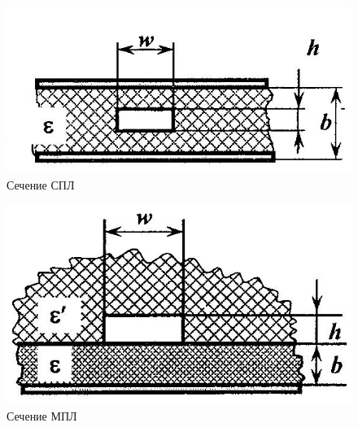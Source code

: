 \documentclass[fontsize=14pt,a4paper]{scrartcl}
\begin{document}
    \begin{figure}[h!]
      \centering
      \includegraphics[scale=0.5]{data/lab_5/fig/3.png}
      \caption{Сечение СПЛ}
      \label{fig:ris3}
    \end{figure}

    \begin{figure}[h!]
      \centering
      \includegraphics[scale=0.5]{data/lab_5/fig/4.png}
      \caption{Сечение МПЛ}
      \label{fig:ris4}
    \end{figure}
\end{document}
